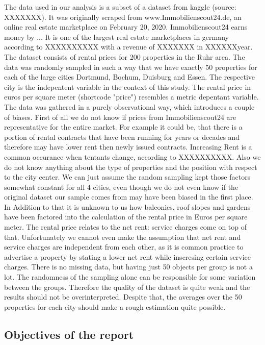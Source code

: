 \documentclass[12 pt]{scrartcl}
\begin{document}
The data used in our analysis is a subset of a dataset from kaggle (source: XXXXXXX). It was originally scraped from www.Immobilienscout24.de, an online real estate marketplace on February 20, 2020. Immobilienscout24 earns money by ...
It is one of the largest real estate marketplaces in germany according to XXXXXXXXXX with a revenue of XXXXXXX in XXXXXXyear.
The dataset consists of rental prices for 200 properties in the Ruhr area. The data was randomly sampled in such a way that we have exactly 50 properties for each of the large cities Dortmund, Bochum, Duisburg and Essen. The respective city is the indepentent variable in the context of this study. The rental price in euros per square meter (shortcode "price") resembles a metric depentant variable. The data was gathered in a purely observational way, which introduces a couple of biases. First of all we do not know if prices from Immobilienscout24 are representative for the entire market. For example it could be, that there is a portion of rental contracts that have been running for years or decades and therefore may have lower rent then newly issued contracts. Increasing Rent is a common occurance when tentants change, according to XXXXXXXXXX. Also we do not know anything about the type of properties and the position with respect to the city center. We can just assume the random sampling kept those factors somewhat constant for all 4 cities, even though we do not even know if the original dataset our sample comes from may have been biased in the first place. In Addition to that it is unknown to us how balconies, roof slopes and gardens have been factored into the calculation of the rental price in Euros per square meter.
The rental price relates to the net rent: service charges come on top of that. Unfortunately we cannot even make the assumption that net rent and service charges are independent from each other, as it is common practice to advertise a property by stating a lower net rent while inscresing certain service charges.
There is no missing data, but having just 50 objects per group is not a lot. The randomness of the sampling alone can be responsible for some variation between the groups.
Therefore the quality of the dataset is quite weak and the results should not be overinterpreted. Despite that, the averages over the 50 properties for each city should make a rough estimation quite possible.

\subsection{Objectives of the report}
\end{document}
